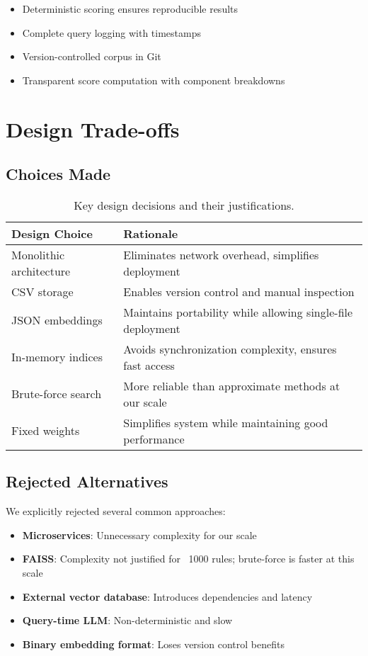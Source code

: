 \begin{itemize}[leftmargin=*,itemsep=2pt,topsep=2pt]
  \item Deterministic scoring ensures reproducible results
  \item Complete query logging with timestamps
  \item Version-controlled corpus in Git
  \item Transparent score computation with component breakdowns
\end{itemize}

\section{Design Trade-offs}

\subsection{Choices Made}

\begin{table}[!ht]
\centering
\begin{tabular}{p{3.5cm}p{7.5cm}}
\toprule
\textbf{Design Choice} & \textbf{Rationale} \\
\midrule
Monolithic architecture & Eliminates network overhead, simplifies deployment \\
CSV storage & Enables version control and manual inspection \\
JSON embeddings & Maintains portability while allowing single-file deployment \\
In-memory indices & Avoids synchronization complexity, ensures fast access \\
Brute-force search & More reliable than approximate methods at our scale \\
Fixed weights & Simplifies system while maintaining good performance \\
\bottomrule
\end{tabular}
\caption{Key design decisions and their justifications.}
\label{tab:design-choices}
\end{table}

\subsection{Rejected Alternatives}

We explicitly rejected several common approaches:

\begin{itemize}[leftmargin=*,itemsep=2pt,topsep=2pt]
  \item \textbf{Microservices}: Unnecessary complexity for our scale
  \item \textbf{FAISS}: Complexity not justified for ~1000 rules; brute-force is faster at this scale
  \item \textbf{External vector database}: Introduces dependencies and latency
  \item \textbf{Query-time LLM}: Non-deterministic and slow
  \item \textbf{Binary embedding format}: Loses version control benefits
\end{itemize}

